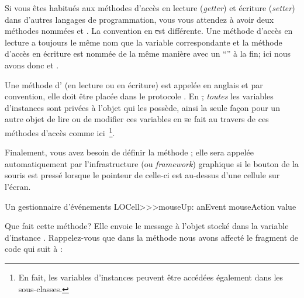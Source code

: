 \documentclass[a4paper,10pt,twoside]{book}
\begin{document}
Si vous êtes habitués aux méthodes d'accès en lecture (\emph{getter})
et écriture (\emph{setter}) dans d'autres langages de programmation,
vous vous attendez à avoir deux méthodes nommées 
et .
La convention en \st est différente.
Une méthode d'accès en lecture a toujours le même nom que la variable
correspondante et la méthode d'accès en écriture est nommée de la même
manière avec un ``\ct{:}'' à la fin; ici nous avons donc
 et .

Une méthode d' (en lecture ou en écriture) est appelée
en anglais  et par convention, elle doit être
placée dans le protocole \mbox{.}
En \st, \emph{toutes} les variables d'instances sont privées à
l'objet qui les possède, ainsi la seule façon pour un autre objet de
lire ou de modifier ces variables en \st se fait au travers de
ces méthodes d'accès comme ici~\footnote{En fait, les variables
  d'instances peuvent être accédées également dans les sous-classes.}.


Finalement, vous avez besoin de définir la méthode ; elle
sera appelée automatiquement par l'infrastructure (ou \emph{framework})
graphique si le bouton de la souris est pressé lorsque le pointeur de
celle-ci est au-dessus d'une cellule sur l'écran.

\begin{method}[sbecellmouseup]{Un gestionnaire d'événements}
LOCell>>>mouseUp: anEvent
   mouseAction value
\end{method}


Que fait cette méthode? Elle envoie le message  à l'objet
stocké dans la variable d'instance . 
Rappelez-vous que dans la méthode 
nous avons affecté le fragment de code qui suit à :
\end{document}
